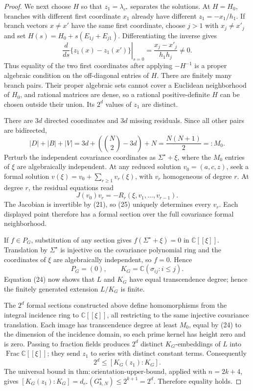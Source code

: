 \documentclass{article}
\begin{document}
\begin{proof}
We next choose \(H\) so that \(z_1=\lambda_{e^{\star}}\) separates the solutions.  At \(H=H_0\), branches with different first coordinate \(x_1\) already have different \(z_1=-x_1/h_1\).  If branch vectors \(x\ne x'\) have the same first coordinate, choose \(j>1\) with \(x_j\ne x'_j\) and set \(H(s)=H_0+s(E_{1j}+E_{j1})\).  Differentiating the inverse gives
\[
 \left.\frac{d}{ds}\{z_1(x)-z_1(x')\}\right|_{s=0}
 =\frac{x_j-x'_j}{h_1h_j}\ne0.
\tag{23}
\]
Thus equality of the two first coordinates after applying \(-H^{-1}\) is a proper algebraic condition on the off-diagonal entries of \(H\).  There are finitely many branch pairs.  Their proper algebraic sets cannot cover a Euclidean neighborhood of \(H_0\), and rational matrices are dense, so a rational positive-definite \(H\) can be chosen outside their union.  Its \(2^d\) values of \(z_1\) are distinct.

There are \(3d\) directed coordinates and \(3d\) missing residuals.  Since all other pairs are bidirected,
\[
 |D|+|B|+|V|
 =3d+\left(\binom N2-3d\right)+N
 =\frac{N(N+1)}2=:M_0.
\tag{24}
\]
Perturb the independent covariance coordinates as \(\Sigma^{\star}+\xi\), where the \(M_0\) entries of \(\xi\) are algebraically independent.  At any reduced solution \(v_0=(a,c,z)\), seek a formal solution \(v(\xi)=v_0+\sum_{r\ge1}v_r(\xi)\), with \(v_r\) homogeneous of degree \(r\).  At degree \(r\), the residual equations read
\[
 J(v_0)v_r=-R_r(\xi,v_1,\ldots,v_{r-1}).
\tag{25}
\]
The Jacobian is invertible by (21), so (25) uniquely determines every \(v_r\).  Each displayed point therefore has a formal section over the full covariance formal neighborhood.

If \(f\in P_G\), substitution of any section gives \(f(\Sigma^{\star}+\xi)=0\) in \(\mathbb C[[\xi]]\).  Translation by \(\Sigma^{\star}\) is injective on the covariance polynomial ring and the coordinates of \(\xi\) are algebraically independent, so \(f=0\).  Hence
\[
 P_G=(0),\qquad K_G=\mathbb C(\sigma_{ij}:i\le j).
\tag{26}
\]
Equation (24) now shows that \(L\) and \(K_G\) have equal transcendence degree; hence the finitely generated extension \(L/K_G\) is finite.

The \(2^d\) formal sections constructed above define homomorphisms from the integral incidence ring to \(\mathbb C[[\xi]]\), all restricting to the same injective covariance translation. Each image has transcendence degree at least \(M_0\), equal by (24) to the dimension of the incidence domain, so each prime kernel has height zero and is zero. Passing to fraction fields produces \(2^d\) distinct \(K_G\)-embeddings of \(L\) into \(\operatorname{Frac}\mathbb C[[\xi]]\); they send \(z_1\) to series with distinct constant terms. Consequently
\[
 2^d\leq[K_G(z_1):K_G].
\tag{27}
\]
The universal bound in \(\mathrm{thm:orientation\mbox{-}upper\mbox{-}bound}\), applied with \(n=2k+4\), gives \([K_G(z_1):K_G]=d_{e^{\star}}(G^{\star}_{k,N})\leq2^{k+1}=2^d\). Therefore equality holds.


\end{proof}
\end{document}
